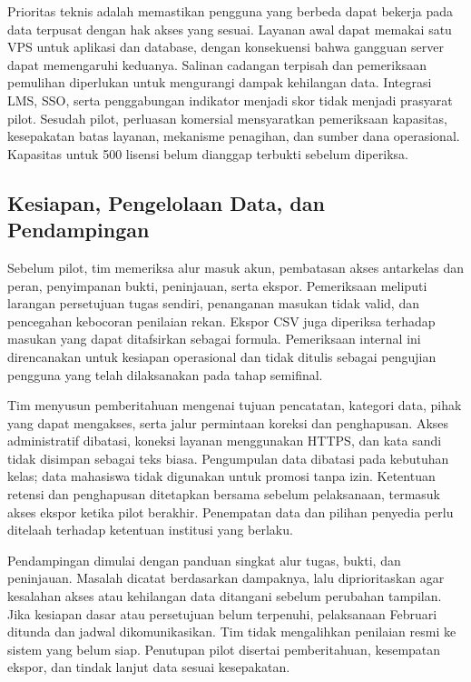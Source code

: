 \documentclass[12pt,a4paper,oneside]{report}
\begin{document}
Prioritas teknis adalah memastikan pengguna yang berbeda dapat bekerja pada data terpusat dengan hak akses yang sesuai. Layanan awal dapat memakai satu VPS untuk aplikasi dan database, dengan konsekuensi bahwa gangguan server dapat memengaruhi keduanya. Salinan cadangan terpisah dan pemeriksaan pemulihan diperlukan untuk mengurangi dampak kehilangan data. Integrasi LMS, SSO, serta penggabungan indikator menjadi skor tidak menjadi prasyarat pilot. Sesudah pilot, perluasan komersial mensyaratkan pemeriksaan kapasitas, kesepakatan batas layanan, mekanisme penagihan, dan sumber dana operasional. Kapasitas untuk 500 lisensi belum dianggap terbukti sebelum diperiksa.

\subsection{Kesiapan, Pengelolaan Data, dan Pendampingan}
Sebelum pilot, tim memeriksa alur masuk akun, pembatasan akses antarkelas dan peran, penyimpanan bukti, peninjauan, serta ekspor. Pemeriksaan meliputi larangan persetujuan tugas sendiri, penanganan masukan tidak valid, dan pencegahan kebocoran penilaian rekan. Ekspor CSV juga diperiksa terhadap masukan yang dapat ditafsirkan sebagai formula. Pemeriksaan internal ini direncanakan untuk kesiapan operasional dan tidak ditulis sebagai pengujian pengguna yang telah dilaksanakan pada tahap semifinal.

Tim menyusun pemberitahuan mengenai tujuan pencatatan, kategori data, pihak yang dapat mengakses, serta jalur permintaan koreksi dan penghapusan. Akses administratif dibatasi, koneksi layanan menggunakan HTTPS, dan kata sandi tidak disimpan sebagai teks biasa. Pengumpulan data dibatasi pada kebutuhan kelas; data mahasiswa tidak digunakan untuk promosi tanpa izin. Ketentuan retensi dan penghapusan ditetapkan bersama sebelum pelaksanaan, termasuk akses ekspor ketika pilot berakhir. Penempatan data dan pilihan penyedia perlu ditelaah terhadap ketentuan institusi yang berlaku.

Pendampingan dimulai dengan panduan singkat alur tugas, bukti, dan peninjauan. Masalah dicatat berdasarkan dampaknya, lalu diprioritaskan agar kesalahan akses atau kehilangan data ditangani sebelum perubahan tampilan. Jika kesiapan dasar atau persetujuan belum terpenuhi, pelaksanaan Februari ditunda dan jadwal dikomunikasikan. Tim tidak mengalihkan penilaian resmi ke sistem yang belum siap. Penutupan pilot disertai pemberitahuan, kesempatan ekspor, dan tindak lanjut data sesuai kesepakatan.
\end{document}
